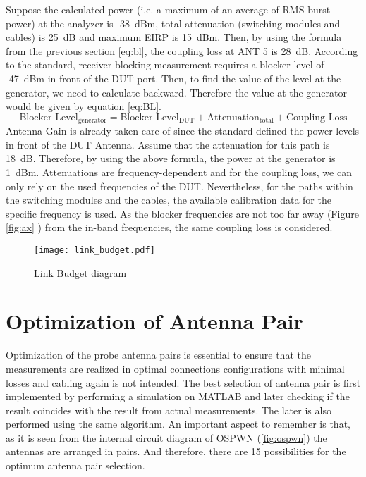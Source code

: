 Suppose the calculated power (i.e. a maximum of an average of \acs{RMS} burst power) at the analyzer is -38~dBm, total attenuation (switching modules and cables) is 25~dB and maximum \acs{EIRP} is 15~dBm. Then, by using the formula from the previous section \ref{eq:bl}, the coupling loss at ANT 5 is 28~dB. According to the standard, receiver blocking measurement requires a blocker level of -47~dBm in front of the \acs{DUT} port. Then, to find the value of the level at the generator, we need to calculate backward. Therefore the value at the generator would be given by equation \ref{eq:BL}.
\begin{equation}
\mbox{Blocker Level}_{\mbox{generator}}  = \mbox{Blocker Level}_{\mbox{DUT}} + \mbox{Attenuation}_{\mbox{total}} + \mbox{Coupling Loss} \label{eq:BL}
\end{equation}
Antenna Gain is already taken care of since the standard defined the power levels in front of the \acs{DUT} Antenna. Assume that the attenuation for this path is 18~dB. Therefore, by using the above formula, the power at the generator is 1~dBm. Attenuations are frequency-dependent and for the coupling loss, we can only rely on the used frequencies of the \acs{DUT}. Nevertheless, for the paths within the switching modules and the cables, the available calibration data for the specific frequency is used. As the blocker frequencies are not too far away (Figure \ref{fig:ax} ) from the in-band frequencies, the same coupling loss is considered.

\begin{figure}[H]
\texttt{[image: link\_budget.pdf]}\vspace{-1.6cm}
\caption{Link Budget diagram}
\label{fig:link} 
\end{figure}



\section{Optimization of Antenna Pair} \label{sec:opti}
Optimization of the probe antenna pairs is essential to ensure that the measurements are realized in optimal connections configurations with minimal losses and cabling again is not intended. The best selection of antenna pair is first implemented by performing a simulation on MATLAB\textregistered{} and later checking if the result coincides with the result from actual measurements. The later is also performed using the same algorithm. An important aspect to remember is that, as it is seen from the internal circuit diagram of OSPWN (\ref{fig:ospwn}) the antennas are arranged in pairs. And therefore, there are 15 possibilities for the optimum antenna pair selection.

